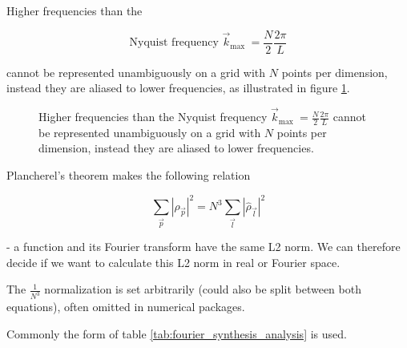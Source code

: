 Higher frequencies than the

\begin{equation}
    \text{Nyquist frequency } \vec{k}_{\text {max }}=\frac{N}{2} \frac{2 \pi}{L}
\end{equation}

cannot be represented unambiguously on a grid with $N$ points per dimension, instead
they are aliased to lower frequencies, as illustrated in figure \ref{fig:aliasing}.

\begin{figure}[ht]
    \centering
    
    \caption{Higher frequencies than the Nyquist frequency $\vec{k}_{\text {max }}=\frac{N}{2} \frac{2 \pi}{L}$ cannot be represented unambiguously on a grid with $N$ points per dimension, instead they are aliased to lower frequencies.}
    \label{fig:aliasing}
\end{figure}

Plancherel's theorem makes the following relation

\begin{equation}
    \sum_{\vec{p}}\left|\rho_{\vec{p}}\right|^2=N^3 \sum_{\vec{l}}\left|\hat{\rho}_{\vec{l}}\right|^2
\end{equation}

- a function and its Fourier transform have the same L2 norm. We can therefore
decide if we want to calculate this L2 norm in real or Fourier space.

The $\frac{1}{N^3}$ normalization is set arbitrarily (could also
be split between both equations), often omitted in numerical packages.

Commonly the form of table \ref{tab:fourier_synthesis_analysis} is used.

